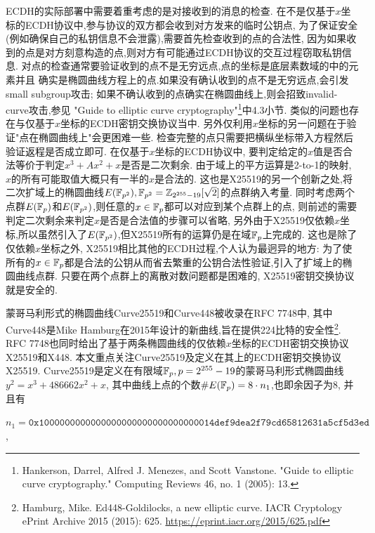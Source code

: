 ECDH的实际部署中需要着重考虑的是对接收到的消息的检查.
在不是仅基于$x$坐标的ECDH协议中,参与协议的双方都会收到对方发来的临时公钥点,
为了保证安全(例如确保自己的私钥信息不会泄露),需要首先检查收到的点的合法性,
因为如果收到的点是对方刻意构造的点,则对方有可能通过ECDH协议的交互过程窃取私钥信息.
对点的检查通常要验证收到的点不是无穷远点,点的坐标是底层素数域的中的元素并且
确实是椭圆曲线方程上的点.如果没有确认收到的点不是无穷远点,会引发small subgroup攻击;
如果不确认收到的点确实在椭圆曲线上,则会招致invalid-curve攻击,参见
"Guide to elliptic curve cryptography"\footnote{
Hankerson, Darrel, Alfred J. Menezes, and Scott Vanstone. "Guide to elliptic curve cryptography." 
Computing Reviews 46, no. 1 (2005): 13.}中4.3小节.
类似的问题也存在与仅基于$x$坐标的ECDH密钥交换协议当中.
另外仅利用$x$坐标的另一问题在于验证"点在椭圆曲线上"会更困难一些.
检查完整的点只需要把横纵坐标带入方程然后验证返程是否成立即可.
在仅基于$x$坐标的ECDH协议中,
要判定给定的$x$值是否合法等价于判定$x^3+Ax^2+x$是否是二次剩余.
由于域上的平方运算是2-to-1的映射, $x$的所有可能取值大概只有一半的$x$是合法的.
这也是X25519的另一个创新之处,将二次扩域上的椭圆曲线$E(\mathbb{F}_{p^2}), 
\mathbb{F}_{p^2} = \mathbb{Z}_{2^{255}-19}[\sqrt{2}]$的点群纳入考量.
同时考虑两个点群$E(\mathbb{F}_{p})$和$E(\mathbb{F}_{p^2})$,则任意的$x\in\mathbb{F}_p$都可以对应到某个点群上的点,
则前述的需要判定二次剩余来判定$x$是否是合法值的步骤可以省略,
另外由于X25519仅依赖$x$坐标,所以虽然引入了$E(\mathbb{F}_{p^2})$,但X25519所有的运算仍是在域$\mathbb{F}_p$上完成的.
这也是除了仅依赖$x$坐标之外, X25519相比其他的ECDH过程,个人认为最迥异的地方:
为了使所有的$x\in\mathbb{F}_p$都是合法的公钥从而省去繁重的公钥合法性验证,引入了扩域上的椭圆曲线点群.
只要在两个点群上的离散对数问题都是困难的, X25519密钥交换协议就是安全的.

蒙哥马利形式的椭圆曲线Curve25519和Curve448被收录在RFC 7748中,
其中Curve448是Mike Hamburg在2015年设计的新曲线,旨在提供224比特的安全性\footnote{
Hamburg, Mike. Ed448-Goldilocks, a new elliptic curve. IACR Cryptology ePrint Archive 2015 (2015): 625.
\url{https://eprint.iacr.org/2015/625.pdf}}.
RFC 7748也同时给出了基于两条椭圆曲线的仅依赖$x$坐标的ECDH密钥交换协议X25519和X448.
本文重点关注Curve25519及定义在其上的ECDH密钥交换协议X25519.
Curve25519是定义在有限域$\mathbb{F}_p, p = 2^{255}-19$的蒙哥马利形式椭圆曲线$y^2 = x^3 + 486662x^2 + x$,
其中曲线上点的个数$\#E(\mathbb{F}_p) = 8 \cdot n_1$,也即余因子为8, 并且有\\
\centerline{$n_1=\texttt{0x1000000000000000000000000000000014def9dea2f79cd65812631a5cf5d3ed}$,}


